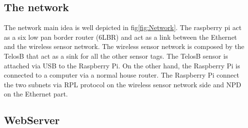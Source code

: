 \subsection{The network}
The network main idea is well depicted in fig\ref{fig:Network}. The raspberry pi act as a six low pan border router (6LBR) and act as a link between the Ethernet and the wireless sensor network. The wireless sensor network is composed by the TelosB that act as a sink for all the other sensor tags. The TelosB sensor is attached via USB to the Raspberry Pi.
On the other hand, the Raspberry Pi is connected to a computer via a normal house router.\cite{6LBR}
The Raspberry Pi connect the two subnets via RPL protocol on the wireless sensor network side and NPD on the Ethernet part.\cite{mode}\\
\subsection{WebServer}




